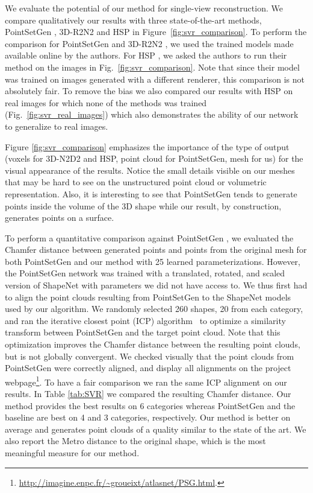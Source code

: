 \documentclass[10pt,twocolumn,letterpaper]{article}
\begin{document}
We evaluate the potential of our method for single-view reconstruction. We compare qualitatively our results with three state-of-the-art methods, PointSetGen \cite{Fan:2017:cvpr}, 3D-R2N2 \cite{choy20163d} and HSP \cite{Hane:2017} in Figure~\ref{fig:svr_comparison}. To perform the comparison for PointSetGen \cite{Fan:2017:cvpr} and 3D-R2N2 \cite{choy20163d}, we used the trained models made available online by the authors. For HSP \cite{Hane:2017}, we asked the authors to run their method on the images in Fig.\ \ref{fig:svr_comparison}. 
Note that since their model was trained on images generated with a different renderer, this comparison is not absolutely fair. To remove the bias we also compared our results with HSP on real images for which none of the methods was trained (Fig.\ \ref{fig:svr_real_images}) which also demonstrates the ability of our network to generalize to real images.


Figure \ref{fig:svr_comparison} emphasizes the importance of the type of output (voxels for 3D-N2D2 and HSP, point cloud for PointSetGen, mesh for us) for the visual appearance of the results. Notice the small details visible on our meshes that may be hard to see on the unstructured point cloud or volumetric representation. Also, it is interesting to see that PointSetGen tends to generate points inside the volume of the 3D shape while our result, by construction, generates points on a surface.


To perform a quantitative comparison against PointSetGen \cite{Fan:2017:cvpr}, we evaluated the Chamfer distance between generated points and points from the original mesh for both PointSetGen and our method with 25 learned parameterizations. However, the PointSetGen network was trained with a translated, rotated, and scaled version of ShapeNet with parameters we did not have access to. We thus first had to align the point clouds resulting from PointSetGen to the ShapeNet models used by our algorithm.
We randomly selected 260 shapes, 20 from each category, and ran the iterative closest point (ICP) algorithm~\cite{besl1992method} to optimize a similarity transform between PointSetGen and the target point cloud. Note that this optimization improves the Chamfer distance between the resulting point clouds, but is not globally convergent. We checked visually that the point clouds from PointSetGen were correctly aligned, and display all alignments on the project webpage\footnote{\url{http://imagine.enpc.fr/~groueixt/atlasnet/PSG.html}.}. To have a fair comparison we ran the same ICP alignment on our results. In Table \ref{tab:SVR} we compared the resulting Chamfer distance. Our method provides the best results on 6 categories whereas PointSetGen and the baseline are best on 4 and 3 categories, respectively. Our method is better on average and generates point clouds of a quality similar to the state of the art. We also report the Metro distance to the original shape, which is the most meaningful measure for our method.
\end{document}
